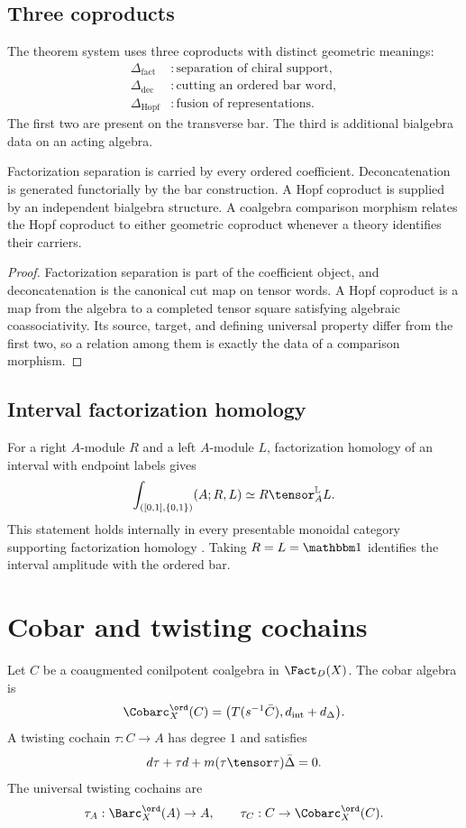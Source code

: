 \section{Three coproducts}
The theorem system uses three coproducts with distinct geometric meanings:
\[
\begin{aligned}
 \Delta_{\mathrm{fact}}&:\text{separation of chiral support},\\
 \Delta_{\mathrm{dec}}&:\text{cutting an ordered bar word},\\
 \Delta_{\mathrm{Hopf}}&:\text{fusion of representations}.
\end{aligned}
\]
The first two are present on the transverse bar.  The third is additional bialgebra data on an acting algebra.

\begin{proposition}
Factorization separation is carried by every ordered coefficient.  Deconcatenation is generated functorially by the bar construction.  A Hopf coproduct is supplied by an independent bialgebra structure.  A coalgebra comparison morphism relates the Hopf coproduct to either geometric coproduct whenever a theory identifies their carriers.
\end{proposition}
\begin{proof}
Factorization separation is part of the coefficient object, and deconcatenation is the canonical cut map on tensor words.  A Hopf coproduct is a map from the algebra to a completed tensor square satisfying algebraic coassociativity.  Its source, target, and defining universal property differ from the first two, so a relation among them is exactly the data of a comparison morphism.
\end{proof}

\section{Interval factorization homology}
For a right $A$-module $R$ and a left $A$-module $L$, factorization homology of an interval with endpoint labels gives
\[
 \int_{([0,1],\{0,1\})}(A;R,L)
 \simeq R\tensor_A^{\mathbb L}L.
\]
This statement holds internally in every presentable monoidal category supporting factorization homology \cite{AFT,LurieHA}. Taking $R=L=\mathbbm1$ identifies the interval amplitude with the ordered bar.

\chapter{Cobar and twisting cochains}
Let $C$ be a coaugmented conilpotent coalgebra in $\Fact_D(X)$. The cobar algebra is
\[
 \Cobarc_X^{\ord}(C)=
 \bigl(T(s^{-1}\bar C),d_{\mathrm{int}}+d_\Delta\bigr).
\]
A twisting cochain $\tau:C\to A$ has degree $1$ and satisfies
\[
 d\tau+\tau d+m(\tau\tensor\tau)\bar\Delta=0.
\]
The universal twisting cochains are
\[
 \tau_A:\Barc_X^{\ord}(A)\to A,
 \qquad
 \tau_C:C\to\Cobarc_X^{\ord}(C).
\]

